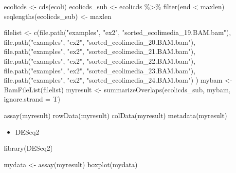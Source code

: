 \documentclass[
]{book}
\newenvironment{Shaded}{\begin{snugshade}}{\end{snugshade}}
\newcommand{\AttributeTok}[1]{\textcolor[rgb]{0.77,0.63,0.00}{#1}}
\newcommand{\FunctionTok}[1]{\textcolor[rgb]{0.00,0.00,0.00}{#1}}
\newcommand{\NormalTok}[1]{#1}
\newcommand{\OtherTok}[1]{\textcolor[rgb]{0.56,0.35,0.01}{#1}}
\newcommand{\SpecialCharTok}[1]{\textcolor[rgb]{0.00,0.00,0.00}{#1}}
\newcommand{\StringTok}[1]{\textcolor[rgb]{0.31,0.60,0.02}{#1}}
\providecommand{\tightlist}{%
  \setlength{\itemsep}{0pt}\setlength{\parskip}{0pt}}
\begin{document}
\begin{Shaded}
\begin{Highlighting}[]

\NormalTok{ecolicds }\OtherTok{\textless{}{-}} \FunctionTok{cds}\NormalTok{(ecoli)}
\NormalTok{ecolicds\_sub }\OtherTok{\textless{}{-}}\NormalTok{ ecolicds }\SpecialCharTok{\%\textgreater{}\%} 
  \FunctionTok{filter}\NormalTok{(end }\SpecialCharTok{\textless{}}\NormalTok{ maxlen)}
\FunctionTok{seqlengths}\NormalTok{(ecolicds\_sub) }\OtherTok{\textless{}{-}}\NormalTok{ maxlen}


\NormalTok{filelist }\OtherTok{\textless{}{-}} \FunctionTok{c}\NormalTok{(}\FunctionTok{file.path}\NormalTok{(}\StringTok{"examples"}\NormalTok{, }\StringTok{"ex2"}\NormalTok{, }\StringTok{"sorted\_ecolimedia\_19.BAM.bam"}\NormalTok{),}
              \FunctionTok{file.path}\NormalTok{(}\StringTok{"examples"}\NormalTok{, }\StringTok{"ex2"}\NormalTok{, }\StringTok{"sorted\_ecolimedia\_20.BAM.bam"}\NormalTok{),}
              \FunctionTok{file.path}\NormalTok{(}\StringTok{"examples"}\NormalTok{, }\StringTok{"ex2"}\NormalTok{, }\StringTok{"sorted\_ecolimedia\_21.BAM.bam"}\NormalTok{),}
              \FunctionTok{file.path}\NormalTok{(}\StringTok{"examples"}\NormalTok{, }\StringTok{"ex2"}\NormalTok{, }\StringTok{"sorted\_ecolimedia\_22.BAM.bam"}\NormalTok{),}
              \FunctionTok{file.path}\NormalTok{(}\StringTok{"examples"}\NormalTok{, }\StringTok{"ex2"}\NormalTok{, }\StringTok{"sorted\_ecolimedia\_23.BAM.bam"}\NormalTok{),}
              \FunctionTok{file.path}\NormalTok{(}\StringTok{"examples"}\NormalTok{, }\StringTok{"ex2"}\NormalTok{, }\StringTok{"sorted\_ecolimedia\_24.BAM.bam"}\NormalTok{)}
\NormalTok{              )}
\NormalTok{mybam }\OtherTok{\textless{}{-}} \FunctionTok{BamFileList}\NormalTok{(filelist)}
\NormalTok{myresult }\OtherTok{\textless{}{-}} \FunctionTok{summarizeOverlaps}\NormalTok{(ecolicds\_sub, mybam, }\AttributeTok{ignore.strand =}\NormalTok{ T)}

\FunctionTok{assay}\NormalTok{(myresult)}
\FunctionTok{rowData}\NormalTok{(myresult)}
\FunctionTok{colData}\NormalTok{(myresult)}
\FunctionTok{metadata}\NormalTok{(myresult)}
\end{Highlighting}
\end{Shaded}

\begin{itemize}
\tightlist
\item
  DESeq2
\end{itemize}

\begin{Shaded}
\begin{Highlighting}[]
\FunctionTok{library}\NormalTok{(DESeq2)}

\NormalTok{mydata }\OtherTok{\textless{}{-}} \FunctionTok{assay}\NormalTok{(myresult)}
\FunctionTok{boxplot}\NormalTok{(mydata)}
\end{Highlighting}
\end{Shaded}
\end{document}
